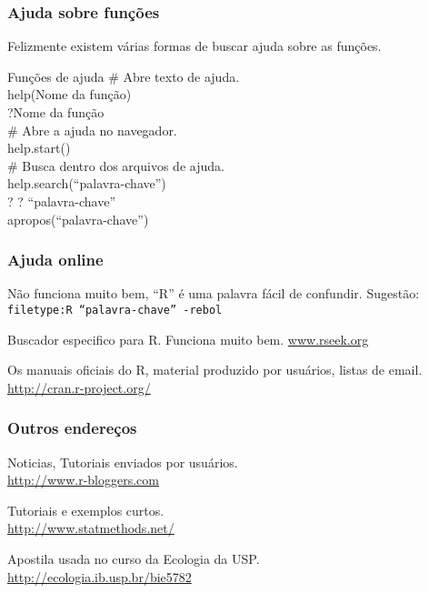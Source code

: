 \documentclass{beamer}
\begin{document}
\begin{frame}
  \frametitle{Ajuda sobre funções}
   Felizmente existem várias formas de buscar ajuda sobre as funções.
   \begin{block}{Funções de ajuda}
      \# Abre texto de ajuda. \\
      help(Nome da função)\\
     ?Nome da função    \\
     \vspace{10pt}
      \# Abre a ajuda no navegador.\\
       help.start() \\
     \vspace{10pt}
      \# Busca dentro dos arquivos de ajuda.\\
        help.search(``palavra-chave'')\\
        ? ? ``palavra-chave'' \\
       apropos(``palavra-chave'')
   \end{block}
\end{frame}
\begin{frame}
  \frametitle{Ajuda online}
  \begin{description}[<+->]
    \item[Google] Não funciona muito bem, ``R'' é uma palavra fácil de confundir. Sugestão:\\ \texttt{filetype:R ``palavra-chave'' -rebol}
      \item[Rseek] Buscador especifico para R. Funciona muito bem. \url{www.rseek.org}
      \item[Site do R] Os manuais oficiais do R, material produzido por usuários, listas de email.\\
     \url{http://cran.r-project.org/}  
  \end{description}
\end{frame}
\begin{frame}
  \frametitle{Outros endereços}
  \begin{description}[<+->]
     \item[R-bloggers] Noticias, Tutoriais enviados por usuários.\\
           \url{http://www.r-bloggers.com}
     \item[Quick-R] Tutoriais e exemplos curtos.\\
          \url{http://www.statmethods.net/}
    \item[Apostila online] Apostila usada no curso da Ecologia da USP. \\
         \url{http://ecologia.ib.usp.br/bie5782}
    \end{description}
\end{frame}
\end{document}
